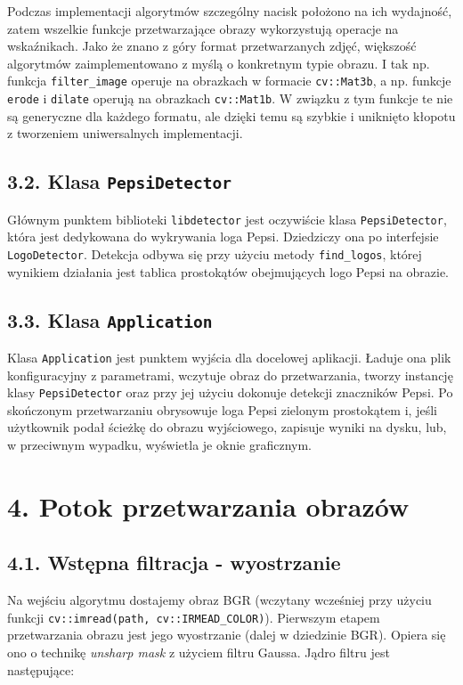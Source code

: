 \documentclass[11pt,a4paper,twoside]{report}
\begin{document}
		Podczas implementacji algorytmów szczególny nacisk położono na ich wydajność, zatem wszelkie funkcje przetwarzające obrazy wykorzystują operacje na wskaźnikach. Jako że znano z góry format przetwarzanych zdjęć, większość algorytmów zaimplementowano z myślą o konkretnym typie obrazu. I tak np. funkcja \texttt{filter\_image} operuje na obrazkach w formacie \texttt{cv::Mat3b}, a np. funkcje \texttt{erode} i \texttt{dilate} operują na obrazkach \texttt{cv::Mat1b}. W związku z tym funkcje te nie są generyczne dla każdego formatu, ale dzięki temu są szybkie i uniknięto kłopotu z tworzeniem uniwersalnych implementacji.

	\subsection*{3.2. Klasa \texttt{PepsiDetector}}

		Głównym punktem biblioteki \texttt{libdetector} jest oczywiście klasa \texttt{PepsiDetector}, która jest dedykowana do wykrywania loga Pepsi. Dziedziczy ona po interfejsie \texttt{LogoDetector}. Detekcja odbywa się przy użyciu metody \texttt{find\_logos}, której wynikiem działania jest tablica prostokątów obejmujących logo Pepsi na obrazie.

	\subsection*{3.3. Klasa \texttt{Application}}

		Klasa \texttt{Application} jest punktem wyjścia dla docelowej aplikacji. Ładuje ona plik konfiguracyjny z parametrami, wczytuje obraz do przetwarzania, tworzy instancję klasy \texttt{PepsiDetector} oraz przy jej użyciu dokonuje detekcji znaczników Pepsi. Po skończonym przetwarzaniu obrysowuje loga Pepsi zielonym prostokątem i, jeśli użytkownik podał ścieżkę do obrazu wyjściowego, zapisuje wyniki na dysku, lub, w przeciwnym wypadku, wyświetla je oknie graficznym.

\section*{4. Potok przetwarzania obrazów}

	\subsection*{4.1. Wstępna filtracja - wyostrzanie}

			Na wejściu algorytmu dostajemy obraz BGR (wczytany wcześniej przy użyciu funkcji \texttt{cv::imread(path, cv::IRMEAD\_COLOR)}). Pierwszym etapem przetwarzania obrazu jest jego wyostrzanie (dalej w dziedzinie BGR). Opiera się ono o technikę \emph{unsharp mask} z użyciem filtru Gaussa. Jądro filtru jest następujące:
\end{document}
